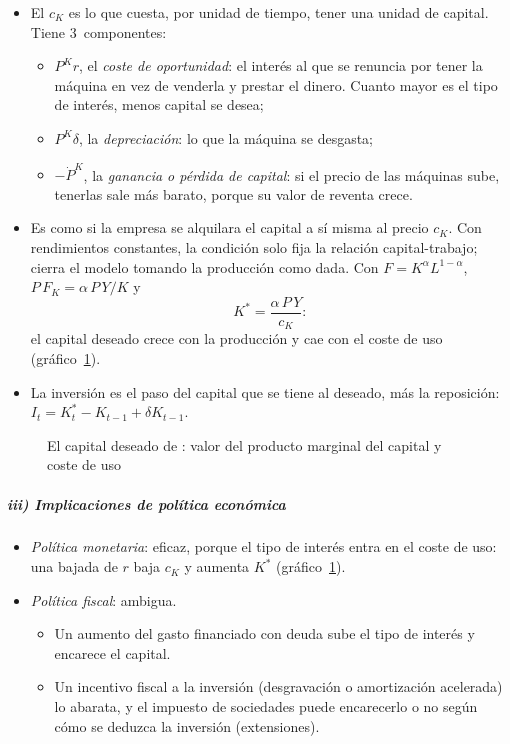 \documentclass[11pt]{article}
\begin{document}
\begin{itemize}
\item El  $c_K$ es lo que cuesta, por unidad de tiempo, tener una unidad de capital. Tiene 3~componentes:
  \begin{itemize}
  \item $P^K r$, el \emph{coste de oportunidad}: el interés al que se renuncia por tener la máquina en vez de venderla y prestar el dinero. Cuanto mayor es el tipo de interés, menos capital se desea;
  \item $P^K\delta$, la \emph{depreciación}: lo que la máquina se desgasta;
  \item $-\dot P^K$, la \emph{ganancia o pérdida de capital}: si el precio de las máquinas sube, tenerlas sale más barato, porque su valor de reventa crece.
  \end{itemize}
\item Es como si la empresa se alquilara el capital a sí misma al precio $c_K$\nocite{HallJorgenson1967Tax}. Con rendimientos constantes, la condición solo fija la relación capital-trabajo;  cierra el modelo tomando la producción como dada. Con $F=K^{\alpha}L^{1-\alpha}$, $P\,F_K=\alpha\,P\,Y/K$ y
  \begin{equation*}
  K^*=\frac{\alpha\,P\,Y}{c_K}:
  \end{equation*}
  el capital deseado crece con la producción y cae con el coste de uso (gráfico~\ref{fig:jorgenson}).
\item La inversión es el paso del capital que se tiene al deseado, más la reposición: $I_t=K^*_t-K_{t-1}+\delta K_{t-1}$.
\end{itemize}

\begin{figure}[H]
\centering
\caption{El capital deseado de : valor del producto marginal del capital y coste de uso}\label{fig:jorgenson}
\end{figure}

\subparagraph{iii) Implicaciones de política económica}

\begin{itemize}
\item \emph{Política monetaria}: eficaz, porque el tipo de interés entra en el coste de uso: una bajada de $r$ baja $c_K$ y aumenta $K^*$ (gráfico~\ref{fig:jorgenson}).
\item \emph{Política fiscal}: ambigua.
  \begin{itemize}
  \item Un aumento del gasto financiado con deuda sube el tipo de interés y encarece el capital.
  \item Un incentivo fiscal a la inversión (desgravación o amortización acelerada) lo abarata, y el impuesto de sociedades puede encarecerlo o no según cómo se deduzca la inversión (extensiones).
  \end{itemize}
\end{itemize}
\end{document}
